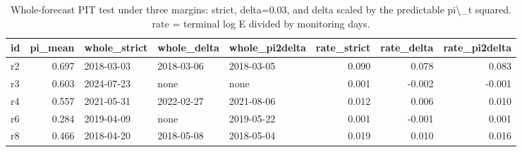 \begin{table}

\caption{Whole-forecast PIT test under three margins: strict, delta=0.03, and delta scaled by the predictable pi\textbackslash{}\_t squared. rate = terminal log E divided by monitoring days.}
\centering
\begin{tabular}[t]{lrlllrrr}
\toprule
id & pi\_mean & whole\_strict & whole\_delta & whole\_pi2delta & rate\_strict & rate\_delta & rate\_pi2delta\\
\midrule
r2 & 0.697 & 2018-03-03 & 2018-03-06 & 2018-03-05 & 0.090 & 0.078 & 0.083\\
r3 & 0.603 & 2024-07-23 & none & none & 0.001 & -0.002 & -0.001\\
r4 & 0.557 & 2021-05-31 & 2022-02-27 & 2021-08-06 & 0.012 & 0.006 & 0.010\\
r6 & 0.284 & 2019-04-09 & none & 2019-05-22 & 0.001 & -0.001 & 0.001\\
r8 & 0.466 & 2018-04-20 & 2018-05-08 & 2018-05-04 & 0.019 & 0.010 & 0.016\\
\bottomrule
\end{tabular}
\end{table}
